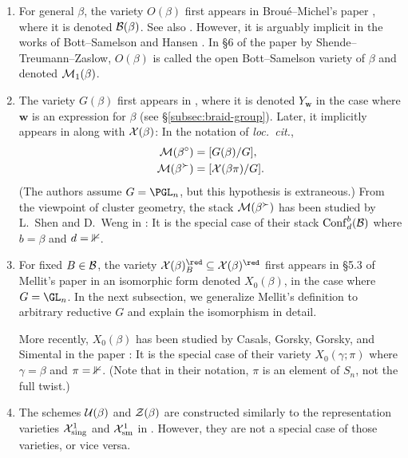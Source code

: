 \documentclass[a4paper,10pt,leqno]{amsart}
\theoremstyle{plain}
\theoremstyle{plain}
\theoremstyle{plain}
\theoremstyle{definition}
\theoremstyle{remark}
\begin{document}
\begin{enumerate}
\item 	For general $\beta$, the variety $O(\beta)$ first appears in Brou\'e--Michel's paper \cite{bm_1997}, where it is denoted $\cal{B}(\beta)$.
		See also \cite[Application 2]{deligne_1997}.
		However, it is arguably implicit in the works of Bott--Samelson \cite{bs} and Hansen \cite{hansen}.
		In \S{6} of the paper \cite{stz} by Shende--Treumann--Zaslow, $O(\beta)$ is called the open Bott--Samelson variety of $\beta$ and denoted $\cal{M}_1(\beta)$.
\item 	The variety $G(\beta)$ first appears in \cite[\S{2.5}]{lusztig_1985_1}, where it is denoted $Y_{\mathbf{w}}$ in the case where $\mathbf{w}$ is an expression for $\beta$ (see \S\ref{subsec:braid-group}).
		Later, it implicitly appears in \cite[\S{6}]{stz} along with $\cal{X}(\beta)$:
		In the notation of \emph{loc.\ cit.},
		\begin{align}
		\cal{M}(\beta^\circ) &= [G(\beta)/G],\\
		\cal{M}(\beta^\succ) &= [\cal{X}(\beta\pi)/G].
		\end{align}
		(The authors assume $G = \PGL_n$, but this hypothesis is extraneous.)
		From the viewpoint of cluster geometry, the stack $\cal{M}(\beta^\succ)$ has been studied by L.\ Shen and D.\ Weng in \cite{sw}:
		It is the special case of their stack $\ur{Conf}_d^b(\cal{B})$ where $b = \beta$ and $d = \bb{1}$.
\item 	For fixed $B \in \cal{B}$, the variety $\cal{X}(\beta)_B^\red \subseteq \cal{X}(\beta)^\red$ first appears in \S{5.3} of Mellit's paper \cite{mellit} in an isomorphic form denoted $X_0(\beta)$, in the case where $G = \GL_n$.
		In the next subsection, we generalize Mellit's definition to arbitrary reductive $G$ and explain the isomorphism in detail.
		
		More recently, $X_0(\beta)$ has been studied by Casals, Gorsky, Gorsky, and Simental in the paper \cite{cggs}:
		It is the special case of their variety $X_0(\gamma; \pi)$ where $\gamma = \beta$ and $\pi = \bb{1}$.
		(Note that in their notation, $\pi$ is an element of $S_n$, not the full twist.)
\item 	The schemes $\cal{U}(\beta)$ and $\cal{Z}(\beta)$ are constructed similarly to the representation varieties $\cal{X}_\mathrm{sing}^1$ and $\cal{X}_\mathrm{sm}^1$ in \cite[\S{8}]{mellit}.
		However, they are not a special case of those varieties, or vice versa.
\end{enumerate}
\end{document}
